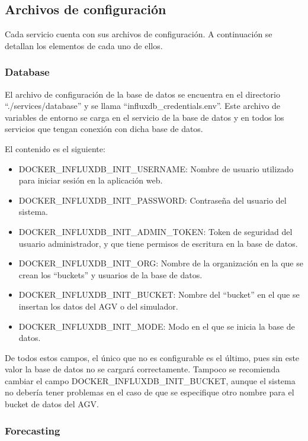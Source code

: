 \subsection{Archivos de configuración}

Cada servicio cuenta con sus archivos de configuración. A continuación se detallan los elementos 
de cada uno de ellos.

\subsubsection{Database}
El archivo de configuración de la base de datos se encuentra en el directorio ``./services/database'' 
y se llama ``influxdb\_credentials.env''. Este archivo de variables de entorno se carga en el servicio 
de la base de datos y en todos los servicios que tengan conexión con dicha base de datos.

El contenido es el siguiente:
\begin{itemize}
    \item DOCKER\_INFLUXDB\_INIT\_USERNAME: Nombre de usuario utilizado para iniciar sesión en la aplicación web.
    \item DOCKER\_INFLUXDB\_INIT\_PASSWORD: Contraseña del usuario del sistema.
    \item DOCKER\_INFLUXDB\_INIT\_ADMIN\_TOKEN: Token de seguridad del usuario administrador, y que tiene permisos 
        de escritura en la base de datos.
    \item DOCKER\_INFLUXDB\_INIT\_ORG: Nombre de la organización en la que se crean los ``buckets'' y usuarios de
        la base de datos.
    \item DOCKER\_INFLUXDB\_INIT\_BUCKET: Nombre del ``bucket'' en el que se insertan los datos del AGV o del simulador.
    \item DOCKER\_INFLUXDB\_INIT\_MODE: Modo en el que se inicia la base de datos.
\end{itemize}
De todos estos campos, el único que no es configurable es el último, pues sin este valor la base de datos 
no se cargará correctamente. Tampoco se recomienda cambiar el campo DOCKER\_INFLUXDB\_INIT\_BUCKET, aunque 
el sistema no debería tener problemas en el caso de que se especifique otro nombre para el bucket de datos del AGV.

\subsubsection{Forecasting}

